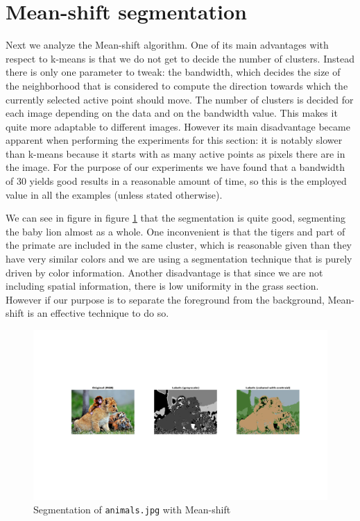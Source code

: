 \section{Mean-shift segmentation}

Next we analyze the Mean-shift algorithm. One of its main advantages with
respect to k-means is that we do not get to decide the number of clusters.
Instead there is only one parameter to tweak: the bandwidth, which decides
the size of the neighborhood that is considered to compute the direction
towards which the currently selected active point should move. The number
of clusters is decided for each image depending on the data and on the
bandwidth value.
This makes it quite more adaptable to different images. However its main
disadvantage became apparent when performing the experiments for this
section: it is notably slower than k-means because it starts with as many
active points as pixels there are in the image. For the purpose of our
experiments we have found that a bandwidth of 30 yields good results in
a reasonable amount of time, so this is the employed value in all the
examples (unless stated otherwise).

We can see in figure in figure \ref{fig:animals-d30-no-spatial} that the
segmentation is quite good, segmenting the baby lion almost as a whole.
One inconvenient is that the tigers and part of the primate
are included in the same cluster, which is reasonable given than they have
very similar colors and we are using a segmentation technique that is purely driven
by color information. Another disadvantage is that since we are not including
spatial information, there is low uniformity in the grass section.
However if our purpose is to separate the
foreground from the background, Mean-shift is an effective technique to do so.

\begin{figure}[hbt]
\centering
\includegraphics[trim={50px 250px 50px 220px},clip,width=\textwidth]{img/mshift/animals_d30_no_spatial.png}
\caption{Segmentation of \texttt{animals.jpg} with Mean-shift}
\label{fig:animals-d30-no-spatial}
\end{figure}


